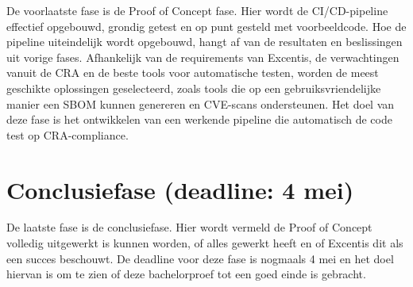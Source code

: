 De voorlaatste fase is de Proof of Concept fase. Hier wordt de CI/CD-pipeline effectief opgebouwd, grondig getest en op punt gesteld met voorbeeldcode. Hoe de pipeline uiteindelijk wordt opgebouwd, hangt af van de resultaten en beslissingen uit vorige fases. Afhankelijk van de requirements van Excentis, de verwachtingen vanuit de CRA en de beste tools voor automatische testen, worden de meest geschikte oplossingen geselecteerd, zoals tools die op een gebruiksvriendelijke manier een SBOM kunnen genereren en CVE-scans ondersteunen. Het doel van deze fase is het ontwikkelen van een werkende pipeline die automatisch de code test op CRA-compliance.

\section{Conclusiefase (deadline: 4 mei)}

De laatste fase is de conclusiefase. Hier wordt vermeld de Proof of Concept volledig uitgewerkt is kunnen worden, of alles gewerkt heeft en of Excentis dit als een succes beschouwt. De deadline voor deze fase is nogmaals 4 mei en het doel hiervan is om te zien of deze bachelorproef tot een goed einde is gebracht.

